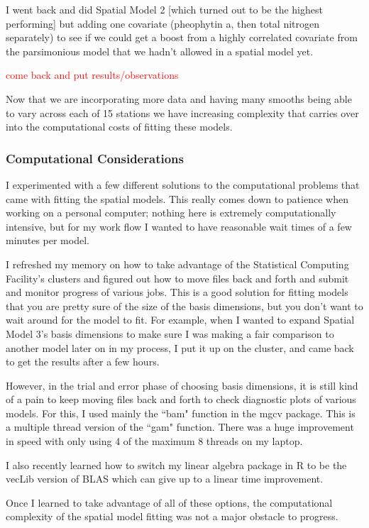\documentclass[12pt]{amsart}
\begin{document}
I went back and did Spatial Model 2 [which turned out to be the highest performing] but adding one covariate (pheophytin a, then total nitrogen separately) to see if we could get a boost from a highly correlated covariate from the parsimonious model that we hadn't allowed in a spatial model yet. 

\textcolor{red}{come back and put results/observations}

Now that we are incorporating more data and having many smooths being able to vary across each of 15 stations we have increasing complexity that carries over into the computational costs of fitting these models. 

\subsubsection{Computational Considerations}

I experimented with a few different solutions to the computational problems that came with fitting the spatial models. This really comes down to patience when working on a personal computer; nothing here is extremely computationally intensive, but for my work flow I wanted to have reasonable wait times of a few minutes per model. 

I refreshed my memory on how to take advantage of the Statistical Computing Facility's clusters and figured out how to move files back and forth and submit and monitor progress of various jobs. This is a good solution for fitting models that you are pretty sure of the size of the basis dimensions, but you don't want to wait around for the model to fit. For example, when I wanted to expand Spatial Model 3's basis dimensions to make sure I was making a fair comparison to another model later on in my process, I put it up on the cluster, and came back to get the results after a few hours.

However, in the trial and error phase of choosing basis dimensions, it is still kind of a pain to keep moving files back and forth to check diagnostic plots of various models. For this, I used mainly the ``bam" function in the mgcv package. This is a multiple thread version of the ``gam" function. There was a huge improvement in speed with only using 4 of the maximum 8 threads on my laptop.

I also recently learned how to switch my linear algebra package in R to be the vecLib version of BLAS which can give up to a linear time improvement. 

Once I learned to take advantage of all of these options, the computational complexity of the spatial model fitting was not a major obstacle to progress.
\end{document}
